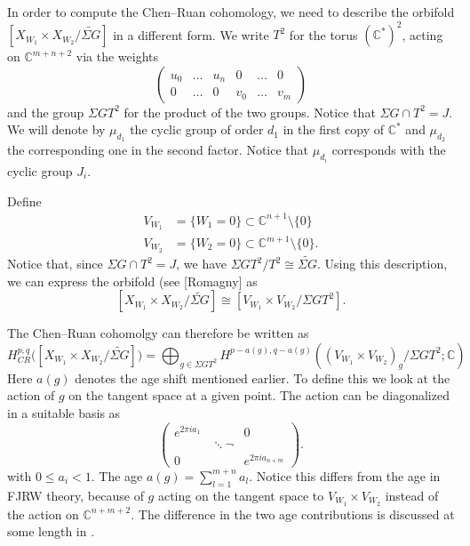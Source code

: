 \documentclass[10pt, letterpaper]{amsart}
\theoremstyle{remark}
\newcommand{\CC}{\mathbb C}
\newcommand{\set}[1]{\{#1\}}
\newcommand{\s}[1]{\Sigma #1}
\begin{document}
In order to compute the Chen--Ruan cohomology, we need to describe the orbifold $\left[X_{W_1}\times X_{W_2}/\widetilde{\s{G}}\right]$ in a different form.
We write $T^2$ for the torus $(\CC^*)^2$, acting on $\CC^{m+n+2}$ via the weights 
\[
\left(\begin{matrix}
u_0 & \dots & u_n & 0 & \dots & 0 \\
0 & \dots & 0 & v_0 & \dots & v_m   
\end{matrix}
\right)
\]
and the group $\s{G}T^2$ for the product of the two groups. Notice that $\s{G}\cap T^2=J$. We will denote by $\mu_{d_1}$ the cyclic group of order $d_1$ in the first copy of $\CC^*$ and $\mu_{d_2}$ the corresponding one in the second factor. Notice that $\mu_{d_i}$ corresponds with the cyclic group $J_i$. 

Define 
\begin{align*}
V_{W_1}&=\set{W_1=0}\subset \CC^{n+1}\setminus \set{0}    \\
V_{W_2}&=\set{W_2=0}\subset \CC^{m+1}\setminus \set{0}.
\end{align*}
Notice that, since $\s{G}\cap T^2=J$, we have $\s{G}T^2/T^2\cong \widetilde{\s{G}}$. Using this description, we can express the orbifold (see \cite{}[Romagny] as 
\[
\left[X_{W_1}\times X_{W_2}/\widetilde{\s{G}}\right]\cong \left[V_{W_1}\times V_{W_2}/\s{G}T^2\right].
\]
 
The Chen--Ruan cohomolgy can therefore be written as %
\begin{equation}\label{e:CRdirectsum}
H^{p,q}_{CR}\Big(\left[X_{W_1}\times X_{W_2}/\widetilde{\s{G}}\right]\Big)=\bigoplus_{g\in\s{G}T^2}H^{p-a(g),q-a(g)}((V_{W_1}\times V_{W_2})_{g}/\s{G}T^2;\CC)
\end{equation}
Here $a(g)$ denotes the age shift mentioned earlier. To define this we look at the action of $g$ on the tangent space at a given point. The action can be diagonalized in a suitable basis as
\[
\left(\begin{matrix}
e^{2\pi i a_1} & & 0 \\
& \ddots ¬ \\
0& & e^{2\pi i a_{n+m}}
\end{matrix}\right).
\]
with $0\leq a_i<1$. The age $a(g)=\sum_{l=1}^{m+n}a_l$. Notice this differs from the age in FJRW theory, because of $g$ acting on the tangent space to $V_{W_1}\times V_{W_2}$ instead of the action on $\CC^{n+m+2}$. The difference in the two age contributions is discussed at some length in \cite{ChR}. 
\end{document}
